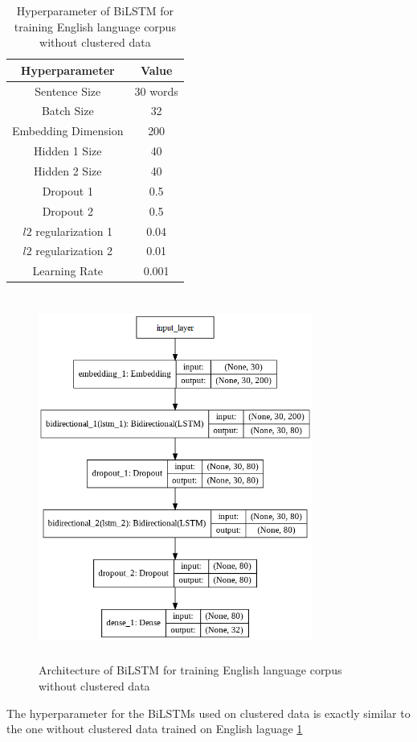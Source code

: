 \begin{table}[!ht]
\centering
\begin{tabular}{cc}
\hline
\textbf{Hyperparameter} & \textbf{Value} \\ \hline
Sentence Size & 30 words \\
Batch Size & 32 \\
Embedding Dimension & 200 \\
Hidden 1 Size & 40 \\
Hidden 2 Size & 40 \\
Dropout 1 & 0.5 \\
Dropout 2 & 0.5 \\
$l2$ regularization 1 & 0.04 \\
$l2$ regularization 2 & 0.01 \\
Learning Rate & 0.001 \\ \hline
\end{tabular}
 \captionsetup{justification=centering,margin=2cm}
\caption{Hyperparameter of \gls{BiLSTM} for training English language corpus without clustered data}
\label{table:hyperparameterLSTM32class}
\end{table}


\begin{figure}[!ht]
    \centering
    \includegraphics[width=9cm, height=12cm]{pics/EN_32.png}
    \captionsetup{justification=centering,margin=2cm}
    \caption{Architecture of \gls{BiLSTM} for training English language corpus without clustered data}
    \label{fig:PlainLSTM}
\end{figure}
\clearpage
The hyperparameter for the \glspl{BiLSTM} used on clustered data is exactly similar to the one without clustered data trained on English laguage \ref{table:hyperparameterLSTM32class}

